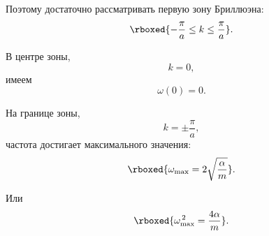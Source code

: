 \documentclass[../final.tex]{subfiles}
\begin{document}
Поэтому достаточно рассматривать первую зону Бриллюэна:
%
\begin{equation*}
    \rboxed{
        -\frac{\pi}{a}
        \leq
        k
        \leq
        \frac{\pi}{a}
    }.
\end{equation*}

В центре зоны,
%
\begin{equation*}
    k=0,
\end{equation*}
%
имеем
%
\begin{equation*}
    \omega(0)=0.
\end{equation*}

На границе зоны,
%
\begin{equation*}
    k=\pm\frac{\pi}{a},
\end{equation*}
%
частота достигает максимального значения:
%
\begin{equation*}
    \rboxed{
        \omega_{\max}
        =
        2\sqrt{\frac{\alpha}{m}}
    }.
\end{equation*}

Или
%
\begin{equation*}
    \rboxed{
        \omega_{\max}^{\,2}
        =
        \frac{4\alpha}{m}
    }.
\end{equation*}


\end{document}
